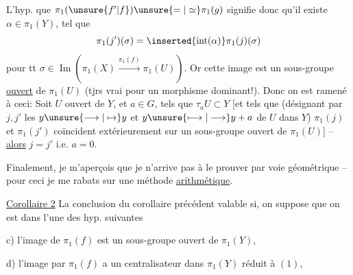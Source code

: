 L'hyp. que $\pi_1(\unsure{f'|f})\unsure{=|\simeq}\pi_1(g)$ signifie donc qu'il existe $\alpha\in\pi_1(Y)$, tel que
\[
\pi_1(j')(\sigma)=\inserted{\operatorname{int}(\alpha)}\pi_1(j)(\sigma)
\]
pour tt $\sigma\in\operatorname{Im}(\pi_1(X)\xrightarrow{\pi_1(f)}\pi_1(U))$. Or cette image est un sous-groupe \uline{ouvert} de $\pi_1(U)$ (tjrs vrai pour un morphisme dominant!).  Donc on est ramené à ceci: Soit $U$ ouvert \inserted{$\ne\varnothing$} de $Y$, et $a\in G$, tels que $\tau_aU\subset Y$ [et tels que (désignant par $j,j'$ les   $y\unsure{\longrightarrow|\mapsto}y$ et $y\unsure{\longmapsto|\longrightarrow}y+a$ de $U$ dans $Y$) $\pi_1(j)$ et $\pi_1(j')$ coïncident extérieurement sur un sous-groupe ouvert de $\pi_1(U)$] -- \uline{alors} $j=j'$ i.e. $a=0$.


Finalement, je m'aperçois que je n'arrive pas à le prouver par voie géométrique -- pour ceci je me rabats sur une méthode \uline{arithmétique}.



\uline{Corollaire 2} La conclusion  du corollaire précédent    valable si,  on suppose que   on est dans l'une des hyp. suivantes

c) l'image de $\pi_1(f)$ est un sous-groupe ouvert de $\pi_1(Y)$, 

d) l'image  par $\pi_1(f)$  a un centralisateur dans $\pi_1(Y)$ réduit à $(1)$,  

